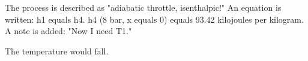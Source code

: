 The process is described as "adiabatic throttle, isenthalpic!"  
An equation is written:  
h1 equals h4.  
h4 (8 bar, x equals 0) equals 93.42 kilojoules per kilogram.  
A note is added: "Now I need T1."

The temperature would fall.